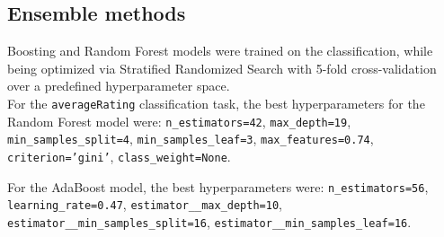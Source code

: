 \subsection{Ensemble methods}
Boosting and Random Forest models were trained on the classification,
while being optimized via Stratified Randomized Search with 5-fold
cross-validation over a predefined hyperparameter space.\\








For the \texttt{averageRating} classification task, the best
hyperparameters for the Random Forest model were:
\texttt{n\_estimators=42}, \texttt{max\_depth=19}, \texttt{min\_samples\_split=4},
\texttt{min\_samples\_leaf=3}, \texttt{max\_features=0.74},
\texttt{criterion='gini'}, \texttt{class\_weight=None}.

For the AdaBoost model, the best hyperparameters were:
\texttt{n\_estimators=56}, \texttt{learning\_rate=0.47},
\texttt{estimator\_\_max\_depth=10},
\texttt{estimator\_\_min\_samples\_split=16},
\texttt{estimator\_\_min\_samples\_leaf=16}.

